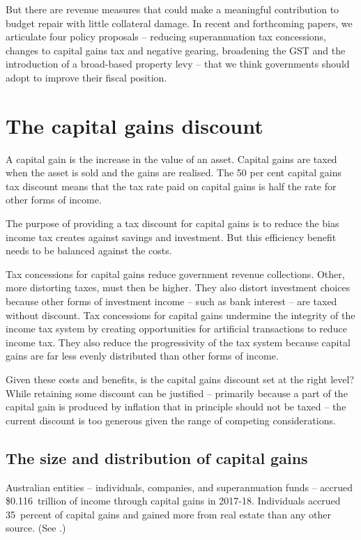 \documentclass{grattan}\usepackage[]{graphicx}\usepackage[]{color}
\begin{document}
But there are revenue measures that could make a meaningful contribution to budget repair with little collateral damage. In recent and forthcoming papers, we articulate four policy proposals -- reducing superannuation tax concessions, changes to capital gains tax and negative gearing, broadening the GST and the introduction of a broad-based property levy -- that we think governments should adopt to improve their fiscal position.

\chapter{The capital gains discount}
A capital gain is the increase in the value of an asset. Capital gains are taxed when the asset is sold and the gains are realised. The 50 per cent capital gains tax discount means that the tax rate paid on capital gains is half the rate for other forms of income. 

The purpose of providing a tax discount for capital gains is to reduce the bias income tax creates against savings and investment. But this efficiency benefit needs to be balanced against the costs. 

Tax concessions for capital gains reduce government revenue collections. Other, more distorting taxes, must then be higher. They also distort investment choices because other forms of investment income – such as bank interest – are taxed without discount. Tax concessions for capital gains undermine the integrity of the income tax system by creating opportunities for artificial transactions to reduce income tax. They also reduce the progressivity of the tax system because capital gains are far less evenly distributed than other forms of income. 

Given these costs and benefits, is the capital gains discount set at the right level? While retaining some discount can be justified – primarily because a part of the capital gain is produced by inflation that in principle should not be taxed – the current discount is too generous given the range of competing considerations.


\section{The size and distribution of capital gains}




Australian entities -- individuals, companies, and superannuation funds -- accrued \$0.116~trillion of income through capital gains in 2017-18. Individuals accrued 35~percent
of capital gains and gained more from real estate than any other source. (See .)
\end{document}
